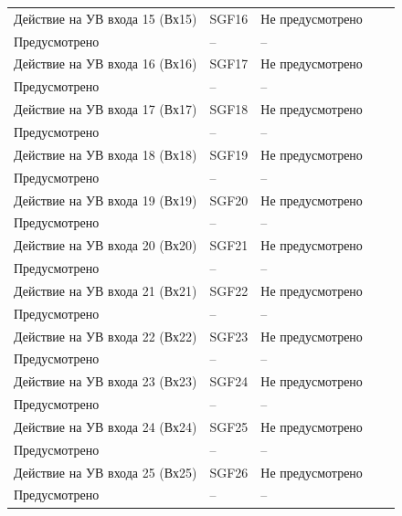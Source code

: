 \begin{longtable}{|>{\centering\arraybackslash}m{5.3cm}|>{\centering\arraybackslash}m{3.3cm}|>{\centering\arraybackslash}m{4.2cm}|>{\centering\arraybackslash}m{1.8cm}|>{\centering\arraybackslash}m{1cm}|}
\hline
\centering Действие на УВ входа 15 (Вх15)  & \centering SGF16 & \centering Не предусмотрено \\ Предусмотрено & \centering -- & \centering \arraybackslash -- \\
\hline
\centering Действие на УВ входа 16 (Вх16)  & \centering SGF17 & \centering Не предусмотрено \\ Предусмотрено & \centering -- & \centering \arraybackslash -- \\
\hline
\centering Действие на УВ входа 17 (Вх17)  & \centering SGF18 & \centering Не предусмотрено \\ Предусмотрено & \centering -- & \centering \arraybackslash -- \\
\hline
\centering Действие на УВ входа 18 (Вх18)  & \centering SGF19 & \centering Не предусмотрено \\ Предусмотрено & \centering -- & \centering \arraybackslash -- \\
\hline
\centering Действие на УВ входа 19 (Вх19)  & \centering SGF20 & \centering Не предусмотрено \\ Предусмотрено & \centering -- & \centering \arraybackslash -- \\
\hline
\centering Действие на УВ входа 20 (Вх20)  & \centering SGF21 & \centering Не предусмотрено \\ Предусмотрено & \centering -- & \centering \arraybackslash -- \\
\hline
\centering Действие на УВ входа 21 (Вх21)  & \centering SGF22 & \centering Не предусмотрено \\ Предусмотрено & \centering -- & \centering \arraybackslash -- \\
\hline
\centering Действие на УВ входа 22 (Вх22)  & \centering SGF23 & \centering Не предусмотрено \\ Предусмотрено & \centering -- & \centering \arraybackslash -- \\
\hline
\centering Действие на УВ входа 23 (Вх23)  & \centering SGF24 & \centering Не предусмотрено \\ Предусмотрено & \centering -- & \centering \arraybackslash -- \\
\hline
\centering Действие на УВ входа 24 (Вх24)  & \centering SGF25 & \centering Не предусмотрено \\ Предусмотрено & \centering -- & \centering \arraybackslash -- \\
\hline
\centering Действие на УВ входа 25 (Вх25)  & \centering SGF26 & \centering Не предусмотрено \\ Предусмотрено & \centering -- & \centering \arraybackslash -- \\

\end{longtable}
